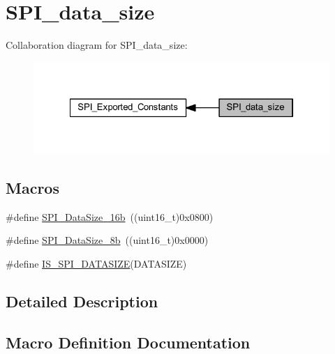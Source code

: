 \hypertarget{group___s_p_i__data__size}{}\section{S\+P\+I\+\_\+data\+\_\+size}
\label{group___s_p_i__data__size}
Collaboration diagram for S\+P\+I\+\_\+data\+\_\+size\+:
\nopagebreak
\begin{figure}[H]
\begin{center}
\leavevmode
\includegraphics[width=322pt]{group___s_p_i__data__size}
\end{center}
\end{figure}
\subsection*{Macros}
\begin{DoxyCompactItemize}
\item 
\#define \hyperlink{group___s_p_i__data__size_ga8af2c8ca5c2162423531ebf560e0a41d}{S\+P\+I\+\_\+\+Data\+Size\+\_\+16b}~((uint16\+\_\+t)0x0800)
\item 
\#define \hyperlink{group___s_p_i__data__size_ga56721814a935922b6ca7c49060509765}{S\+P\+I\+\_\+\+Data\+Size\+\_\+8b}~((uint16\+\_\+t)0x0000)
\item 
\#define \hyperlink{group___s_p_i__data__size_gab6f9f528f7eb70373b9caf3548e44e67}{I\+S\+\_\+\+S\+P\+I\+\_\+\+D\+A\+T\+A\+S\+I\+ZE}(D\+A\+T\+A\+S\+I\+ZE)
\end{DoxyCompactItemize}


\subsection{Detailed Description}


\subsection{Macro Definition Documentation}
\mbox{\label{group___s_p_i__data__size_gab6f9f528f7eb70373b9caf3548e44e67}} 
